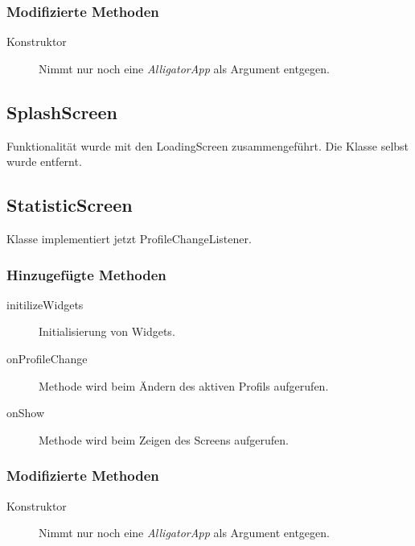 \subsubsection{Modifizierte Methoden}
\begin{description}
\item[Konstruktor]
Nimmt nur noch eine \emph{AlligatorApp} als Argument entgegen.

\end{description}

\subsection{SplashScreen}
Funktionalität wurde mit den LoadingScreen zusammengeführt. Die Klasse selbst wurde entfernt.



\subsection{StatisticScreen}
Klasse implementiert jetzt ProfileChangeListener.
\subsubsection{Hinzugefügte Methoden}
\begin{description}
\item[initilizeWidgets]
Initialisierung von Widgets.
\item[onProfileChange]
Methode wird beim Ändern des aktiven Profils aufgerufen.
\item[onShow]
Methode wird beim Zeigen des Screens aufgerufen.



\end{description}

\subsubsection{Modifizierte Methoden}
\begin{description}
\item[Konstruktor]
Nimmt nur noch eine \emph{AlligatorApp} als Argument entgegen.

\end{description}

